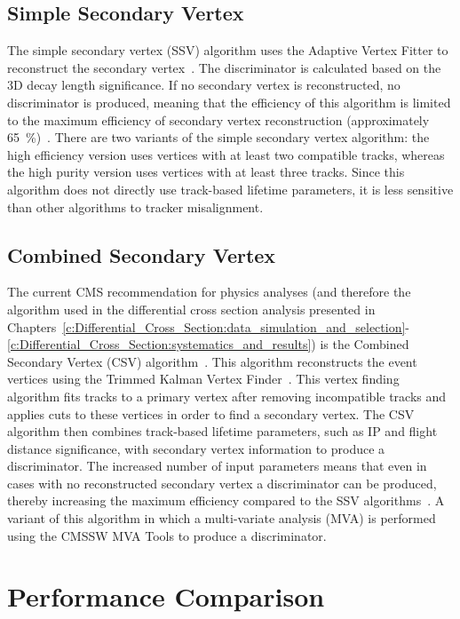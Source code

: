 \subsection*{Simple Secondary Vertex}
\label{ss:simple_secondary_vertex}
The simple secondary vertex (SSV) algorithm uses the Adaptive Vertex Fitter to reconstruct the secondary
vertex~\cite{0954-3899-34-12-N01}. The discriminator is calculated based on the 3D decay length significance.
If no secondary vertex is reconstructed, no discriminator is produced, meaning that the efficiency of this
algorithm is limited to the maximum efficiency of secondary vertex reconstruction (approximately
65~\%)~\cite{Chatrchyan:2012jua}. There are two variants of the simple secondary vertex algorithm: the high
efficiency version uses vertices with at least two compatible tracks, whereas the high purity version uses
vertices with at least three tracks. Since this algorithm does not directly use track-based lifetime
parameters, it is less sensitive than other algorithms to tracker misalignment.

\subsection*{Combined Secondary Vertex}
\label{ss:combined_secondary_vertex}
The current CMS recommendation for physics analyses (and therefore the algorithm used in the differential
cross section analysis presented in
Chapters~\ref{c:Differential_Cross_Section:data_simulation_and_selection}-\ref{c:Differential_Cross_Section:systematics_and_results})
is the Combined Secondary Vertex (CSV) algorithm~\cite{Weiser:2006md}. This algorithm reconstructs the event
vertices using the Trimmed Kalman Vertex Finder~\cite{Speer:927395}. This vertex finding algorithm fits tracks
to a primary vertex after removing incompatible tracks and applies cuts to these vertices in order to find a
secondary vertex. The CSV algorithm then combines track-based lifetime parameters, such as IP and flight
distance significance, with secondary vertex information to produce a discriminator. The increased number of
input parameters means that even in cases with no reconstructed secondary vertex a discriminator can be
produced, thereby increasing the maximum efficiency compared to the SSV algorithms~\cite{Chatrchyan:2012jua}.
A variant of this algorithm in which a multi-variate analysis (MVA) is performed using the CMSSW MVA Tools to
produce a discriminator.

\section{Performance Comparison}
\label{s:performance_comparison}

